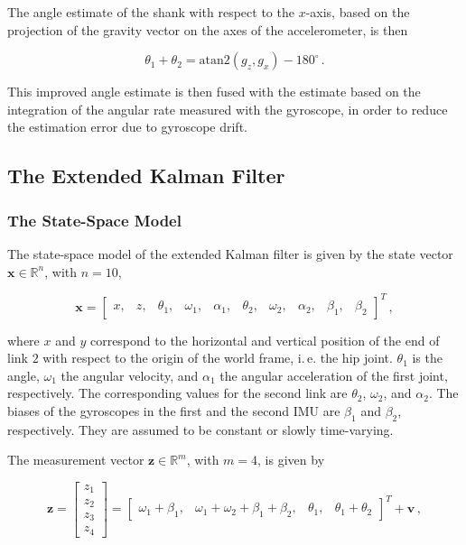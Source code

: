 \noindent
The angle estimate of the shank with respect to the $x$-axis, based on the projection of the gravity vector on the axes of the accelerometer, is then

\begin{equation}
  \theta_1 + \theta_2 = \mbox{atan}2(g_z, g_x)-180^{\circ}\,.
\end{equation}

\noindent
This improved angle estimate is then fused with the estimate based on the integration of the angular rate measured with the gyroscope, in order to reduce the estimation error due to gyroscope drift.

\subsection{The Extended Kalman Filter} \label{sec:EKF_model}

\subsubsection{The State-Space Model}

The state-space model of the extended Kalman filter is given by the state vector $\mathbf{x} \in \mathbb{R}^{n}$, with $n=10$,

\begin{equation} \label{eq:state_vector}
  \mathbf{x} = \begin{bmatrix}
  	x, & z, & \theta_1, & \omega_1, & \alpha_1, & \theta_2, & \omega_2, & \alpha_2, & \beta_1, & \beta_2
  \end{bmatrix}^T\,,
\end{equation}

\noindent
where $x$ and $y$ correspond to the horizontal and vertical position of the end of link $2$ with respect to the origin of the world frame, i.\,e. the hip joint. $\theta_1$ is the angle, $\omega_1$ the angular velocity, and $\alpha_1$ the angular acceleration of the first joint, respectively. The corresponding values for the second link are $\theta_2$, $\omega_2$, and $\alpha_2$. The biases of the gyroscopes in the first and the second IMU are $\beta_1$ and $\beta_2$, respectively. They are assumed to be constant or slowly time-varying.

The measurement vector $\mathbf{z} \in \mathbb{R}^m$, with $m = 4$, is given by

\begin{equation} \label{eq:measurement_vector}
  \mathbf{z} = \begin{bmatrix} z_1 \\ z_2 \\ z_3 \\ z_4 \end{bmatrix} = \begin{bmatrix}
  	\omega_1 + \beta_1, & \omega_1 + \omega_2 + \beta_1 + \beta_2, & \theta_1, & \theta_1 + \theta_2
  \end{bmatrix}^T + \mathbf{v}\,,
\end{equation}
 
